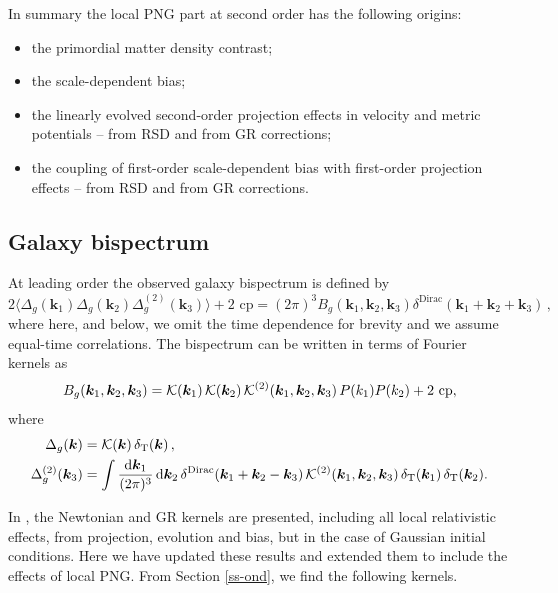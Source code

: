 {{{{\begin{itemize}
{In summary  the local PNG part at second order has the following origins:
\begin{itemize}
\item[\bfseries *] the primordial matter density contrast;
\item[\bfseries *]  the scale-dependent bias; 
\item[\bfseries *]  the linearly evolved second-order projection effects in velocity and metric potentials -- from RSD and from GR corrections;
\item[\bfseries *]  the coupling of first-order scale-dependent bias with first-order projection effects -- from RSD and from GR corrections. \\

\end{itemize} }

\end{itemize}
}
%
\subsection{Galaxy bispectrum}
%
At leading order the observed galaxy bispectrum is defined by \citep{Umeh:2016nuh}
\begin{equation}
 2\big \langle \Delta_{g}({\bm{k}_{1}}) \Delta_{g}({\bm{k}_{2}}) \Delta_{g}^{(2)}({\bm{k}_{3}}) \big \rangle + \mbox{2 cp} =(2\pi)^{3} B_{g}(\bm{k}_{1},\bm{k}_{2},\bm{k}_{3})\delta^{\mathrm{Dirac}}(\bm{k}_{1}+\bm{k}_{2}+\bm{k}_{3})\,, \label{e2.13_1} 
\end{equation}
where here, and below, we  omit the time dependence for brevity and we assume equal-time correlations.
The bispectrum can be written in terms of Fourier kernels as
\begin{equation} \label{bisker}
 B_{g}(\bm{k}_{1},\bm{k}_{2},\bm{k}_{3}) = \mathcal{K}(\bm {k}_1)\, \mathcal{K}(\bm {k}_2)\, \mathcal{K}^{(2)}(\bm {k}_1,\bm {k}_2,\bm {k}_3)\,P(k_1)P(k_2)  + \mbox{2 cp},
\end{equation}
where
\begin{align}
\Delta_{g}(\bm {k}) &= \mathcal{K}(\bm {k}) \, \delta_{\mathrm{T}}(\bm {k})\,,\label{k1} \\
\Delta_{g}^{(2)}(\bm {k}_3) &= \int \frac{\mathrm{d}\bm {k}_1}{(2\pi)^3}\,\mathrm{d} \bm {k}_2\, \delta^{\mathrm{Dirac}}(\bm{k}_{1}+\bm{k}_{2}-\bm{k}_{3})\, \mathcal{K}^{(2)}(\bm {k}_1,\bm {k}_2,\bm {k}_3)\, \delta_{\mathrm{T}}(\bm {k}_1)\,  \delta_{\mathrm{T}}(\bm {k}_2)  .\label{k2}
\end{align}

 In \citep{Jolicoeur:2017eyi}, the Newtonian and GR kernels   are presented, including all local relativistic effects, from projection, evolution and bias, but in the case of Gaussian initial conditions. Here we have updated these results and extended them to include the effects of local PNG. From Section \ref{ss-ond},  we find the following kernels.

}}}
